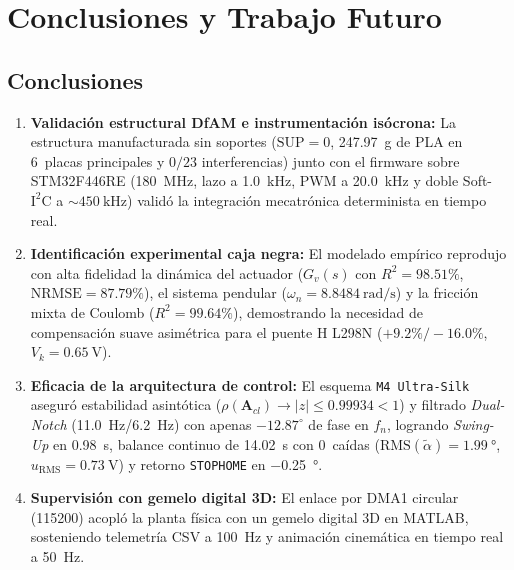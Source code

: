 \section{Conclusiones y Trabajo Futuro}
\label{sec:conclusiones}

\subsection{Conclusiones}
\begin{enumerate}
    \item \textbf{Validación estructural DfAM e instrumentación isócrona:} La estructura manufacturada sin soportes ($\text{SUP}=0$, \qty{247.97}{\gram} de PLA en 6~placas principales y $0/23$ interferencias) junto con el firmware sobre STM32F446RE (\qty{180}{\mega\hertz}, lazo a \qty{1.0}{\kilo\hertz}, PWM a \qty{20.0}{\kilo\hertz} y doble Soft-$\text{I}^2\text{C}$ a $\sim\qty{450}{\kilo\hertz}$) validó la integración mecatrónica determinista en tiempo real.
    \item \textbf{Identificación experimental caja negra:} El modelado empírico reprodujo con alta fidelidad la dinámica del actuador ($G_v(s)$ con $R^2=98.51\%$, $\mathrm{NRMSE}=87.79\%$), el sistema pendular ($\omega_n=\qty{8.8484}{\radian\per\second}$) y la fricción mixta de Coulomb ($R^2=99.64\%$), demostrando la necesidad de compensación suave asimétrica para el puente H L298N ($+9.2\%/-16.0\%$, $V_k=\qty{0.65}{\volt}$).
    \item \textbf{Eficacia de la arquitectura de control:} El esquema \texttt{M4 Ultra-Silk} aseguró estabilidad asintótica ($\rho(\mathbf{A}_{cl})\to |z|\le 0.99934 < 1$) y filtrado \textit{Dual-Notch} (\qty{11.0}{\hertz}/\qty{6.2}{\hertz}) con apenas $-12.87^\circ$ de fase en $f_n$, logrando \textit{Swing-Up} en \qty{0.98}{\second}, balance continuo de \qty{14.02}{\second} con $0$~caídas ($\mathrm{RMS}(\tilde{\alpha})=\qty{1.99}{\degree}$, $u_{\mathrm{RMS}}=\qty{0.73}{\volt}$) y retorno \texttt{STOPHOME} en \qty{-0.25}{\degree}.
    \item \textbf{Supervisión con gemelo digital 3D:} El enlace por DMA1 circular (\qty{115200}{\baudios}) acopló la planta física con un gemelo digital 3D en MATLAB, sosteniendo telemetría CSV a \qty{100}{\hertz} y animación cinemática en tiempo real a \qty{50}{\hertz}.
\end{enumerate}

